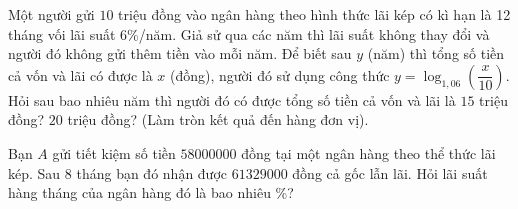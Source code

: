 \begin{bt}%
	Một người gửi $10$ triệu đồng vào ngân hàng theo hình thức lãi kép có kì hạn là 12 tháng vối lãi suất $6\%$/năm. Giả sử qua các năm thì lãi suất không thay đổi và người đó không gửi thêm tiền vào mỗi năm. Để biết sau $y$ (năm) thì tổng số tiền cả vốn và lãi có được là $x$ (đồng), người đó sử dụng công thức $y=\log_{1{,}06}\left(\dfrac{x}{10}\right)$. Hỏi sau bao nhiêu năm thì người đó có được tổng số tiền cả vốn và lãi là $15$ triệu đồng? $20$ triệu đồng? (Làm tròn kết quả đến hàng đơn vị).
\end{bt}

\begin{bt}%
	Bạn $A$ gửi tiết kiệm số tiền $58000000$ đồng tại một ngân hàng theo thể thức lãi kép. Sau $8$ tháng bạn đó nhận được $61329000$ đồng cả gốc lẫn lãi. Hỏi lãi suất hàng tháng của ngân hàng đó là bao nhiêu $\%$?\par
\end{bt}
